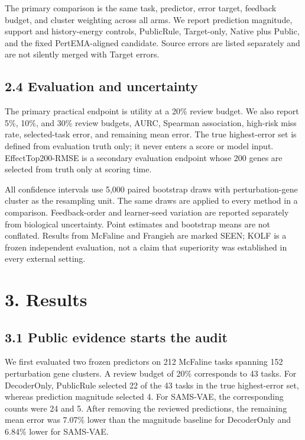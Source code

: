 \documentclass[journal]{IEEEtran}
\begin{document}
The primary comparison is the same task, predictor, error target, feedback budget, and cluster weighting across all arms. We report prediction magnitude, support and history-energy controls, PublicRule, Target-only, Native plus Public, and the fixed PertEMA-aligned candidate. Source errors are listed separately and are not silently merged with Target errors.

\subsection{2.4 Evaluation and uncertainty}

The primary practical endpoint is utility at a 20\% review budget. We also report 5\%, 10\%, and 30\% review budgets, AURC, Spearman association, high-risk miss rate, selected-task error, and remaining mean error. The true highest-error set is defined from evaluation truth only; it never enters a score or model input. EffectTop200-RMSE is a secondary evaluation endpoint whose 200 genes are selected from truth only at scoring time.

All confidence intervals use 5,000 paired bootstrap draws with perturbation-gene cluster as the resampling unit. The same draws are applied to every method in a comparison. Feedback-order and learner-seed variation are reported separately from biological uncertainty. Point estimates and bootstrap means are not conflated. Results from McFaline and Frangieh are marked SEEN; KOLF is a frozen independent evaluation, not a claim that superiority was established in every external setting.

\section{3. Results}

\subsection{3.1 Public evidence starts the audit}

We first evaluated two frozen predictors on 212 McFaline tasks spanning 152 perturbation gene clusters. A review budget of 20\% corresponds to 43 tasks. For DecoderOnly, PublicRule selected 22 of the 43 tasks in the true highest-error set, whereas prediction magnitude selected 4. For SAMS-VAE, the corresponding counts were 24 and 5. After removing the reviewed predictions, the remaining mean error was 7.07\% lower than the magnitude baseline for DecoderOnly and 6.84\% lower for SAMS-VAE.
\end{document}
